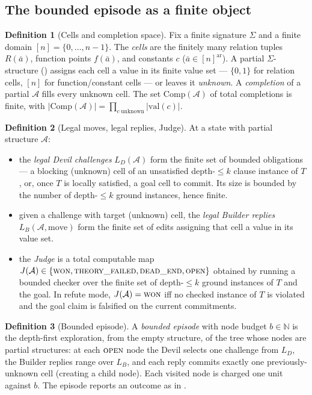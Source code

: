 \documentclass[11pt]{article}
\theoremstyle{definition}
\newtheorem{definition}{Definition}[section]
\theoremstyle{plain}
\newcommand{\Sig}{\Sigma}
\newcommand{\Thy}{T}
\newcommand{\Struct}{\mathcal{A}}
\newcommand{\N}{\mathbb{N}}
\begin{document}
\subsection{The bounded episode as a finite object}

\begin{definition}[Cells and completion space]\label{def:completion}
Fix a finite signature $\Sig$ and a finite domain $[n]=\{0,\dots,n-1\}$. The \emph{cells}
are the finitely many relation tuples $R(\bar a)$, function points $f(\bar a)$, and
constants $c$ ($\bar a\in[n]^{\mathrm{ar}}$). A partial $\Sig$-structure ()
assigns each cell a value in its finite value set --- $\{0,1\}$ for relation cells, $[n]$ for
function/constant cells --- or leaves it \emph{unknown}. A \emph{completion} of a partial
$\Struct$ fills every unknown cell. The set $\mathrm{Comp}(\Struct)$ of total completions is
finite, with $|\mathrm{Comp}(\Struct)| = \prod_{c\ \text{unknown}} |\mathrm{val}(c)|$.
\end{definition}

\begin{definition}[Legal moves, legal replies, Judge]\label{def:legal}
At a state with partial structure $\Struct$:
\begin{itemize}[leftmargin=1.5em]
\item the \emph{legal Devil challenges} $L_D(\Struct)$ form the finite set of bounded obligations
--- a blocking (unknown) cell of an unsatisfied depth-$\le k$ clause instance of $\Thy$, or, once
$\Thy$ is locally satisfied, a goal cell to commit. Its size is bounded by the number of depth-$\le k$
ground instances, hence finite.
\item given a challenge with target (unknown) cell, the \emph{legal Builder replies}
$L_B(\Struct,\text{move})$ form the finite set of edits assigning that cell a value in its value set.
\item the \emph{Judge} is a total computable map $J(\Struct)\in\{\textsc{won},\textsc{theory\_failed},
\textsc{dead\_end},\textsc{open}\}$ obtained by running a bounded checker over the finite set of
depth-$\le k$ ground instances of $\Thy$ and the goal. In refute mode, $J(\Struct)=\textsc{won}$ iff
no checked instance of $\Thy$ is violated and the goal claim is falsified on the current commitments.
\end{itemize}
\end{definition}

\begin{definition}[Bounded episode]\label{def:episode}
A \emph{bounded episode} with node budget $b\in\N$ is the depth-first exploration, from the empty
structure, of the tree whose nodes are partial structures: at each $\textsc{open}$ node the Devil
selects one challenge from $L_D$, the Builder replies range over $L_B$, and each reply commits exactly
one previously-unknown cell (creating a child node). Each visited node is charged one unit against $b$.
The episode reports an outcome as in .
\end{definition}
\end{document}

